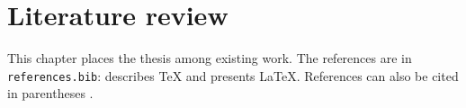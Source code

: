 \chapter{Literature review}
\label{chap:background}

This chapter places the thesis among existing work. The references are in
\texttt{references.bib}: \textcite{knuth1984} describes \TeX{} and
\textcite{lamport1994} presents \LaTeX{}. References can also be cited in
parentheses \parencite{mittelbach2023}.
